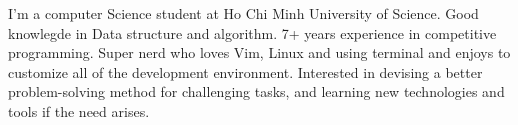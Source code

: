 

\begin{cvparagraph}

I'm a computer Science student at Ho Chi Minh University of Science. Good knowlegde in Data structure and algorithm. 7+ years experience in competitive programming. Super nerd who loves Vim, Linux and using terminal and enjoys to customize all of the development environment. Interested in devising a better problem-solving method for challenging tasks, and learning new technologies and tools if the need arises.
\end{cvparagraph}
